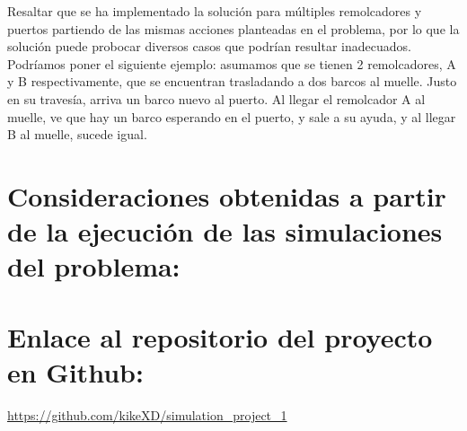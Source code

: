 \documentclass[titlepage,11pt]{scrartcl}
\begin{document}
	Resaltar que se ha implementado la solución para múltiples remolcadores y puertos partiendo de las mismas acciones planteadas en el problema, por lo que la solución puede probocar diversos casos que podrían resultar inadecuados. Podríamos poner el siguiente ejemplo: asumamos que se tienen 2 remolcadores, A y B respectivamente, que se encuentran trasladando a dos barcos al muelle. Justo en su travesía, arriva un barco nuevo al puerto. Al llegar el remolcador A al muelle, ve que hay un barco esperando en el puerto, y sale a su ayuda, y al llegar B al muelle, sucede igual. 

\section{Consideraciones obtenidas a partir de la ejecución de las simulaciones del
problema:}

\section{Enlace al repositorio del proyecto en Github:}
	\url{https://github.com/kikeXD/simulation_project_1}
\end{document}
